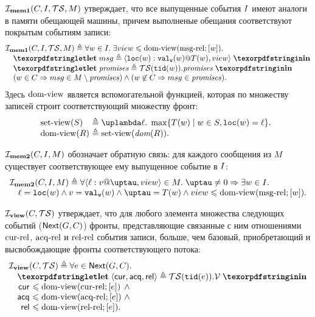   $\mathcal{I}_{\rm \bf mem1}(C, I, \mathcal{TS}, M)$ утверждает, что все выпущенные
  события $I$ имеют аналоги в памяти обещающей машины, причем выполненые обещания соответствуют покрытым
  событиям записи:
  \[\inarr{
  \invMemOne(C, \IssuedSet, \TSf, M) \defeq \forall w \in \IssuedSet. \; \exists \view \le \domView(\msgRel; [w]). \; \\
  \quad \letdef{msg}{\msg{\lLOC(w)}{\lVALW(w)}{T(w)}{\view}} \\
  \quad \letdef{\PromSet}{\TSf(\lTID(w)).\PromSet} \\
  \quad (w \in  C \implies msg \in M \setminus \PromSet) \land (w \nin C \implies msg \in \PromSet). \\
  }\]
  Здесь ${\rm dom\text{-}view}$ является вспомогательной функцией, которая по множеству записей строит соответствующий множеству фронт:
  \[\begin{array}{@{}l@{~}l}
    \setView(S) & \defeq \lambda \loc. \; \max \{ T(w) \mid w \in S, \lLOC(w) = \loc\}. \\
    \domView(R) & \defeq \setView(\dom{R}). \\
  \end{array}\]
  
  $\mathcal{I}_{\rm \bf mem2}(C, I, M)$ обозначает обратную связь: для каждого сообщения из $M$ существует
  соответствующее ему выпущенное событие в $I$:
  \[\inarr{
  \invMemTwo(C, \IssuedSet, M) \defeq \forall \msg{\loc}{\val}{\tau}{\view} \in M. \; \tau \neq 0 \Rightarrow
    \exists w \in \IssuedSet. \; \\
  \quad \loc = \lLOC(w) \land \val = \lVALW(w) \land \tau = T(w) \land \view \le \domView(\msgRel; [w]). \\
  }\]

  $\mathcal{I}_{\rm \bf view}(C, \mathcal{TS})$ утверждает, что для любого элемента множества следующих событий (${\sf Next}(G, C)$)
  фронты, представляющие связанные с ним отношениями ${\rm cur\text{-}rel}$, ${\rm acq\text{-}rel}$ и ${\rm rel\text{-}rel}$ события записи, больше, чем
  базовый, приобретающий и высвобождающие фронты соответствующего потока:
  \[\inarr{
  \invView(C, \TSf) \defeq
  \forall e \in \nextset(G, C). \\
  \quad \letdef{\tup{\viewCur, \viewAcq, \viewfRel}}{\TSf(\lTID(e)).\View} \\
  \quad
  \begin{array}{@{}r@{~}l@{~}l}
    \viewCur & \le \domView(\curRel; [e]) & \land {} \\
    \viewAcq & \le \domView(\acqRel; [e]) & \land {} \\
    \viewfRel & \le \domView(\relRel; [e]). \\
  \end{array}
  }\]

